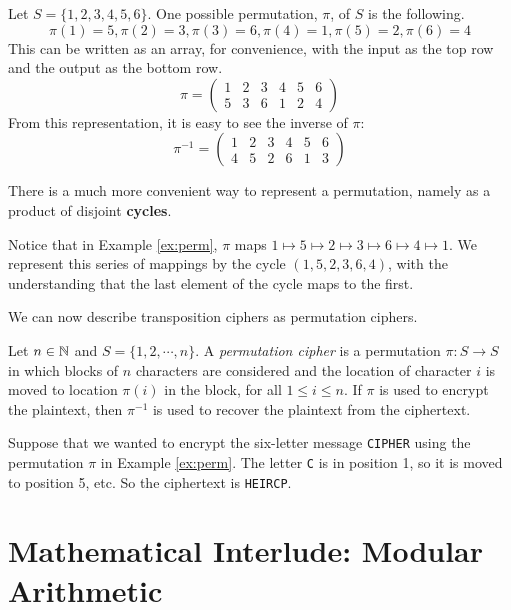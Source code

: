 \begin{example}
\label{ex:perm}
Let $S = \{1, 2, 3, 4, 5, 6\}$. One possible permutation, $\pi$, of $S$ is the following.
$$\pi(1) = 5, \pi(2) = 3, \pi(3) = 6, \pi(4)=1, \pi(5)=2, \pi(6) = 4$$
This can be written as an array, for convenience, with the input as the top row and the output as the bottom row.
$$\pi = \left(
\begin{array}{cccccc}
1 & 2 & 3 & 4 & 5 & 6 \\
5 & 3 & 6 & 1 & 2 & 4
\end{array}
 \right)$$
From this representation, it is easy to see the inverse of $\pi$:
$$\pi^{-1} = \left(
\begin{array}{cccccc}
1 & 2 & 3 & 4 & 5 & 6 \\
4 & 5 & 2 & 6 & 1 & 3
\end{array}
 \right)$$
\end{example}

There is a much more convenient way to represent a permutation, namely as a product of disjoint {\bf cycles}. 

\begin{example}
Notice that in Example \ref{ex:perm}, $\pi$ maps $1 \mapsto 5 \mapsto 2 \mapsto 3 \mapsto 6 \mapsto 4 \mapsto 1$. We represent this series of mappings by the cycle $(1, 5, 2, 3, 6, 4)$, with the understanding that the last element of the cycle maps to the first.
\end{example}

We can now describe transposition ciphers as permutation ciphers.

\begin{definition}
Let $n\in\mathbb{N}$ and $S =\{1, 2, \cdots, n\}$. A {\em permutation cipher}   is a permutation $\pi:S\to S$ in which blocks of $n$ characters are considered and the location of character $i$ is moved to location $\pi(i)$ in the block, for all $1\le i\le n$. If $\pi$ is used to encrypt the plaintext, then $\pi^{-1}$ is used to recover the plaintext from the ciphertext.
\end{definition}

\begin{example}
Suppose that we wanted to encrypt the six-letter message {\tt CIPHER} using the permutation $\pi$ in Example \ref{ex:perm}. The letter {\tt C} is in position 1, so it is moved to position 5, etc. So the ciphertext is {\tt HEIRCP}.
\end{example}

	\section{Mathematical Interlude: Modular Arithmetic}
      \label{ssec:mod}


